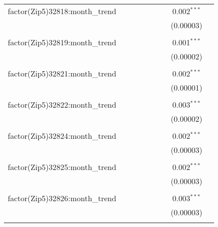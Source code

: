 \begin{table}[H]
{\begin{tabular}{@{\extracolsep{5pt}}lcccccccc}
  factor(Zip5)32818:month\_trend &  &  &  &  &  &  & 0.002$^{***}$ &  \\  

   &  &  &  &  &  &  & (0.00003) &  \\  

   & & & & & & & & \\  

  factor(Zip5)32819:month\_trend &  &  &  &  &  &  & 0.001$^{***}$ &  \\  

   &  &  &  &  &  &  & (0.00002) &  \\  

   & & & & & & & & \\  

  factor(Zip5)32821:month\_trend &  &  &  &  &  &  & 0.002$^{***}$ &  \\  

   &  &  &  &  &  &  & (0.00001) &  \\  

   & & & & & & & & \\  

  factor(Zip5)32822:month\_trend &  &  &  &  &  &  & 0.003$^{***}$ &  \\  

   &  &  &  &  &  &  & (0.00002) &  \\  

   & & & & & & & & \\  

  factor(Zip5)32824:month\_trend &  &  &  &  &  &  & 0.002$^{***}$ &  \\  

   &  &  &  &  &  &  & (0.00003) &  \\  

   & & & & & & & & \\  

  factor(Zip5)32825:month\_trend &  &  &  &  &  &  & 0.002$^{***}$ &  \\  

   &  &  &  &  &  &  & (0.00003) &  \\  

   & & & & & & & & \\  

  factor(Zip5)32826:month\_trend &  &  &  &  &  &  & 0.003$^{***}$ &  \\  

   &  &  &  &  &  &  & (0.00003) &  \\  

   & & & & & & & & \\  


\end{tabular}}
\end{table}
